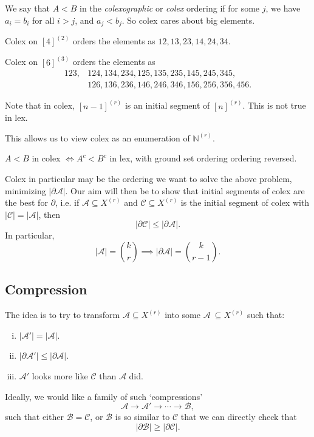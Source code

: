 \documentclass[12pt]{article}
\begin{document}
We say that $A < B$ in the \emph{colexographic} or \emph{colex} ordering if for some $j$, we have $a_i = b_i$ for all $i > j$, and $a_j < b_j$. So colex cares about big elements.


\begin{exbox}
	Colex on $[4]^{(2)}$ orders the elements as $12, 13, 23, 14, 24, 34$.

	Colex on $[6]^{(3)}$ orders the elements as
	\begin{align*}
		123, &124, 134, 234, 125, 135, 235, 145, 245, 345, \\
		     &126, 136, 236, 146, 246, 346, 156, 256, 356, 456.
	\end{align*}
\end{exbox}

Note that in colex, $[n-1]^{(r)}$ is an initial segment of $[n]^{(r)}$. This is not true in lex.

This allows us to view colex as an enumeration of $\mathbb{N}^{(r)}$.

\begin{remark}
	$A < B$ in colex $\iff A^c < B^c$ in lex, with ground set ordering ordering reversed.
\end{remark}

Colex in particular may be the ordering we want to solve the above problem, minimizing $|\partial \mathcal{A}|$. Our aim will then be to show that initial segments of colex are the best for $\partial$, i.e. if $\mathcal{A} \subseteq X^{(r)}$ and $\mathcal{C} \subseteq X^{(r)}$ is the initial segment of colex with $|\mathcal{C}| = |\mathcal{A}|$, then
\[
|\partial \mathcal{C}| \leq |\partial \mathcal{A}|.
\]
In particular,
\[
	|\mathcal{A}| = \binom kr \implies |\partial \mathcal{A}| = \binom k{r-1}.
\]
\subsection{Compression}%
\label{sub:comp}

The idea is to try to transform $\mathcal{A} \subseteq X^{(r)}$ into some $\mathcal{A}\ \subseteq X^{(r)}$ such that:
\begin{enumerate}[(i)]
	\item $|\mathcal{A}'| = |\mathcal{A}|$.
	\item $|\partial \mathcal{A}'| \leq |\partial \mathcal{A}|$.
	\item $\mathcal{A}'$ looks more like $\mathcal{C}$ than $\mathcal{A}$ did.
\end{enumerate}

Ideally, we would like a family of such `compressions'
\[
\mathcal{A} \to \mathcal{A}' \to \cdots \to \mathcal{B},
\]
such that either $\mathcal{B} = \mathcal{C}$, or $\mathcal{B}$ is so similar to $\mathcal{C}$ that we can directly check that
\[
|\partial \mathcal{B}| \geq |\partial \mathcal{C}|.
\]


\newpage

\printindex
\end{document}
